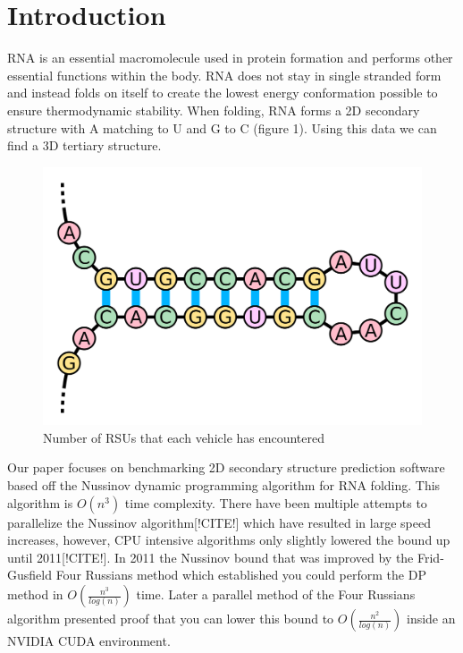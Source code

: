 \documentclass[12pt]{article}
\begin{document}
\section{Introduction}
\par RNA is an essential macromolecule used in protein formation and performs other essential functions within the body\cite{turner}. RNA does not stay in single stranded form and instead folds on itself to create the lowest energy conformation possible to ensure thermodynamic stability\cite{herschlag}. When folding, RNA forms a 2D secondary structure\cite{mccaskill} with A matching to U and G to C (figure 1).  Using this data we can find a 3D tertiary structure\cite{mccaskill}.
\begin{figure}[h!]
  \centering
  \includegraphics[keepaspectratio, scale=0.12]{fold-example.png}
  \caption{Number of RSUs that each vehicle has encountered}
  \label{fig:RSUencountered}
\end{figure}
\par Our paper focuses on benchmarking 2D secondary structure prediction software based off the Nussinov dynamic programming algorithm\cite{nussinov} for RNA folding. This algorithm is $O(n^3)$ time complexity. There have been multiple attempts to parallelize the Nussinov algorithm[!CITE!] which have resulted in large speed increases, however, CPU intensive algorithms only slightly lowered the bound up until 2011[!CITE!]. In 2011 the Nussinov bound that was improved by the Frid-Gusfield Four Russians method which established you could perform the DP method in $O(\frac{n^3}{log(n)})$ time\cite{gusfield}. Later a parallel method of the Four Russians algorithm presented proof that you can lower this bound to $O(\frac{n^2}{log(n)})$ inside an NVIDIA CUDA environment\cite{balaji}.
\end{document}

